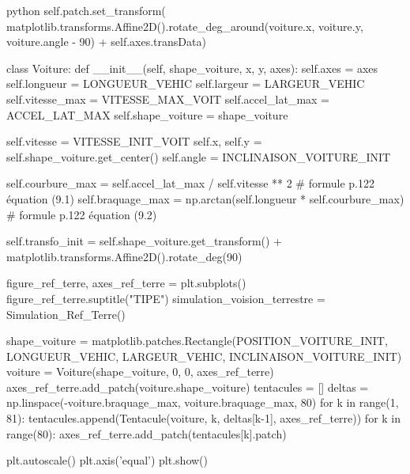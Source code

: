 \begin{mintedbox}{python}
        self.patch.set_transform( matplotlib.transforms.Affine2D().rotate_deg_around(voiture.x, voiture.y, voiture.angle - 90) + self.axes.transData)


class Voiture:
    def __init__(self, shape_voiture, x, y, axes):
        self.axes = axes
        self.longueur = LONGUEUR_VEHIC
        self.largeur = LARGEUR_VEHIC
        self.vitesse_max = VITESSE_MAX_VOIT
        self.accel_lat_max = ACCEL_LAT_MAX
        self.shape_voiture = shape_voiture

        self.vitesse = VITESSE_INIT_VOIT
        self.x, self.y = self.shape_voiture.get_center()
        self.angle = INCLINAISON_VOITURE_INIT

        self.courbure_max = self.accel_lat_max / self.vitesse ** 2  # formule p.122 équation (9.1)
        self.braquage_max = np.arctan(self.longueur * self.courbure_max)  # formule p.122 équation (9.2)

        self.transfo_init = self.shape_voiture.get_transform() + matplotlib.transforms.Affine2D().rotate_deg(90)


figure_ref_terre, axes_ref_terre = plt.subplots()
figure_ref_terre.suptitle("TIPE")
simulation_voision_terrestre = Simulation_Ref_Terre()

shape_voiture = matplotlib.patches.Rectangle(POSITION_VOITURE_INIT, LONGUEUR_VEHIC, LARGEUR_VEHIC, INCLINAISON_VOITURE_INIT)
voiture = Voiture(shape_voiture, 0, 0, axes_ref_terre)
axes_ref_terre.add_patch(voiture.shape_voiture)
tentacules = []
deltas = np.linspace(-voiture.braquage_max, voiture.braquage_max, 80)
for k in range(1, 81):
    tentacules.append(Tentacule(voiture, k, deltas[k-1], axes_ref_terre))
for k in range(80):
    axes_ref_terre.add_patch(tentacules[k].patch)


plt.autoscale()
plt.axis('equal')
plt.show()

\end{mintedbox}